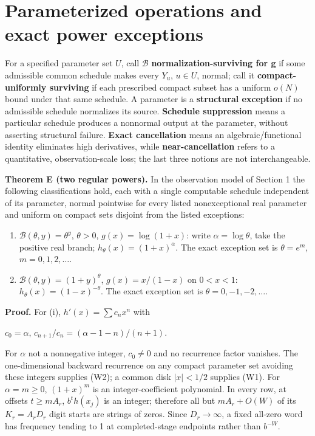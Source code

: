 \documentclass[11pt,a4paper]{article}
\begin{document}
\section{Parameterized operations and exact power
exceptions}\label{parameterized-operations-and-exact-power-exceptions}

For a specified parameter set \(U\), call \(\mathcal B\)
\textbf{normalization-surviving for g} if some admissible common
schedule makes every \(Y_u\), \(u \in U\), normal; call it
\textbf{compact-uniformly surviving} if each prescribed compact subset
has a uniform \(o(N)\) bound under that same schedule. A parameter is a
\textbf{structural exception} if no admissible schedule normalizes its
source. \textbf{Schedule suppression} means a particular schedule
produces a nonnormal output at the parameter, without asserting
structural failure. \textbf{Exact cancellation} means an
algebraic/functional identity eliminates high derivatives, while
\textbf{near-cancellation} refers to a quantitative, observation-scale
loss; the last three notions are not interchangeable.

\textbf{Theorem E (two regular powers).} In the observation model of
Section 1 the following classifications hold, each with a single
computable schedule independent of its parameter, normal pointwise for
every listed nonexceptional real parameter and uniform on compact sets
disjoint from the listed exceptions:

\begin{enumerate}
\def\labelenumi{(\roman{enumi})}
\item
  \(\mathcal B(\theta,y)=\theta^y\), \(\theta>0\), \(g(x)=\log(1+x)\):
  write \(\alpha=\log \theta\), take the positive real branch;
  \(h_\theta(x)=(1+x)^\alpha\). The exact exception set is
  \(\theta=e^m\), \(m=0,1,2,\ldots\).
\item
  \(\mathcal B(\theta,y)=(1+y)^\theta\), \(g(x)=x/(1-x)\) on
  \(0< x< 1\): \(h_\theta(x)=(1-x)^{-\theta}\). The exact exception set
  is \(\theta=0,-1,-2,\ldots\).
\end{enumerate}

\textbf{Proof.} For (i), \(h'(x)=\sum c_n x^n\) with

\(c_0=\alpha\), \(c_{n+1}/c_n=(\alpha-1-n)/(n+1)\).

For \(\alpha\) not a nonnegative integer, \(c_0\ne 0\) and no recurrence
factor vanishes. The one-dimensional backward recurrence on any compact
parameter set avoiding these integers supplies (W2); a common disk
\(|x|< 1/2\) supplies (W1). For \(\alpha=m\ge 0\), \((1+x)^m\) is an
integer-coefficient polynomial. In every row, at offsets \(t\ge m A_r\),
\(b^t h(x_j)\) is an integer; therefore all but \(m A_r+O(W)\) of its
\(K_r=A_rD_r\) digit starts are strings of zeros. Since
\(D_r\longrightarrow \infty\), a fixed all-zero word has frequency
tending to 1 at completed-stage endpoints rather than \(b^{-W}\).
\end{document}
